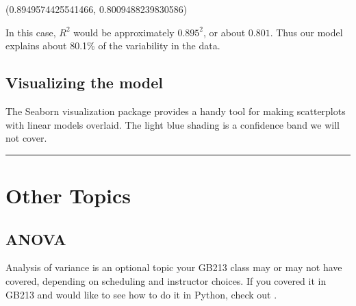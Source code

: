 \documentclass[letterpaper,10pt,english]{sphinxmanual}
\begin{document}
\begin{sphinxVerbatim}[commandchars=\\\{\}]
(0.8949574425541466, 0.8009488239830586)
\end{sphinxVerbatim}

In this case, \(R^2\) would be approximately \(0.895^2\), or about \(0.801\).  Thus our model explains about 80.1\% of the variability in the data.


\subsection{Visualizing the model}
\label{\detokenize{GB213-review-in-Python:visualizing-the-model}}
The Seaborn visualization package provides a handy tool for making scatterplots with linear models overlaid.  The light blue shading is a confidence band we will not cover.

\begin{sphinxVerbatim}[commandchars=\\\{\}]
    
\end{sphinxVerbatim}

\noindent{}


\bigskip\hrule\bigskip



\section{Other Topics}
\label{\detokenize{GB213-review-in-Python:other-topics}}

\subsection{ANOVA}
\label{\detokenize{GB213-review-in-Python:anova}}
Analysis of variance is an optional topic your GB213 class may or may not have covered, depending on scheduling and instructor choices.  If you covered it in GB213 and would like to see how to do it in Python, check out .
\end{document}
